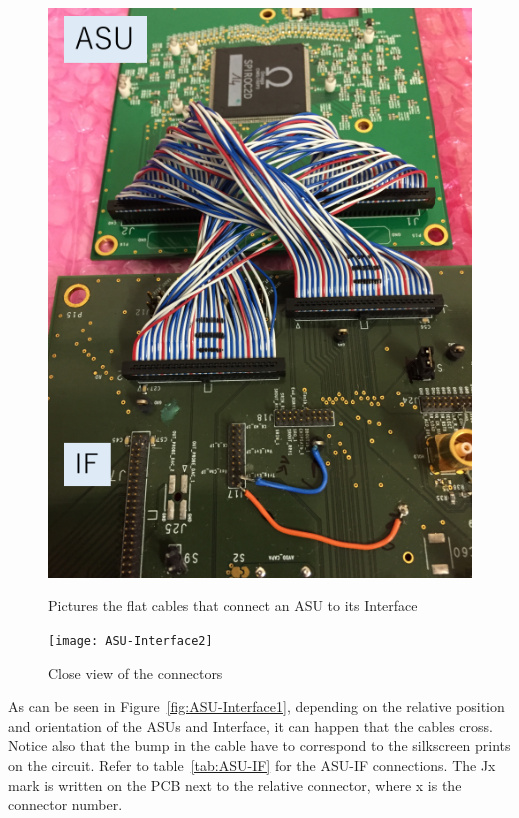 \begin{figure}[ht]
  \centering
  \begin{minipage}{0.4\linewidth}
    \centering \includegraphics[width=0.9\linewidth,frame]{ASU-Interface1}
    \caption{Pictures the flat cables that connect an ASU to its
      Interface}\label{fig:ASU-Interface1}
  \end{minipage}%
  \begin{minipage}{0.5\linewidth}
    \centering \texttt{[image: ASU-Interface2]}
    \caption{Close view of the connectors}\label{fig:ASU-Interface2}
  \end{minipage}
\end{figure}
As can be seen in Figure~\ref{fig:ASU-Interface1}, depending on the relative
position and orientation of the ASUs and Interface, it can happen that the
cables cross. Notice also that the bump in the cable have to correspond to the
silkscreen prints on the circuit. Refer to table~\ref{tab:ASU-IF} for the ASU-IF
connections. The Jx mark is written on the PCB next to the relative connector,
where x is the connector number.
